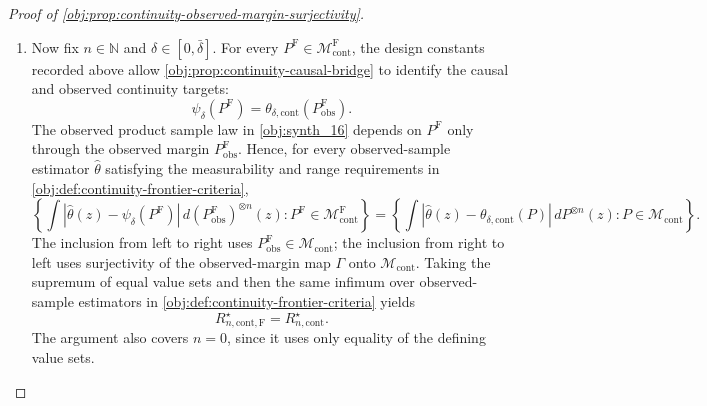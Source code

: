 \begin{proof}[Proof of \cref{obj:prop:continuity-observed-margin-surjectivity}]
\begin{enumerate}
\[
m_x^{\mathrm F}(a)
=
P^{\mathrm F}(X=x)^{-1}
\int_{\{X=x\}}\mathsf Q_x(a,U)\,dP^{\mathrm F}
=
\int_0^1 \mathsf Q_x(a,u)\,d\lambda(u)
=
\eta_P(x,a),
\]
where \(P^{\mathrm F}(X=x)>0\) follows from \(0<p_{\min}\) and \cref{obj:ass:stratum-mass}.  Since \(a\mapsto\eta_P(x,a)\) is continuous on \([0,\bar\delta]\), \cref{obj:ass:full-data-response-continuity} holds.  Therefore
\[
P^{\mathrm F}\in\mathcal M_{\mathrm{cont}}^{\mathrm F},
\qquad
P^{\mathrm F}_{\mathrm{obs}}=P,
\]
with the observed margin understood as in \cref{obj:synth_13}.  This proves surjectivity. %

\item Now fix \(n\in\mathbb N\) and \(\delta\in[0,\bar\delta]\).  For every \(P^{\mathrm F}\in\mathcal M_{\mathrm{cont}}^{\mathrm F}\), the design constants recorded above allow \cref{obj:prop:continuity-causal-bridge} to identify the causal and observed continuity targets:
\[
\psi_\delta(P^{\mathrm F})
=
\theta_{\delta,\mathrm{cont}}(P^{\mathrm F}_{\mathrm{obs}}).
\]
The observed product sample law in \cref{obj:synth_16} depends on \(P^{\mathrm F}\) only through the observed margin \(P^{\mathrm F}_{\mathrm{obs}}\).  Hence, for every observed-sample estimator \(\widehat\theta\) satisfying the measurability and range requirements in \cref{obj:def:continuity-frontier-criteria},
\[
\left\{
\int \left|\widehat\theta(z)-\psi_\delta(P^{\mathrm F})\right|\,
d(P^{\mathrm F}_{\mathrm{obs}})^{\otimes n}(z):
P^{\mathrm F}\in\mathcal M_{\mathrm{cont}}^{\mathrm F}
\right\}
=
\left\{
\int \left|\widehat\theta(z)-\theta_{\delta,\mathrm{cont}}(P)\right|\,
dP^{\otimes n}(z):
P\in\mathcal M_{\mathrm{cont}}
\right\}.
\]
The inclusion from left to right uses \(P^{\mathrm F}_{\mathrm{obs}}\in\mathcal M_{\mathrm{cont}}\); the inclusion from right to left uses surjectivity of the observed-margin map \(\Gamma\) onto \(\mathcal M_{\mathrm{cont}}\).  Taking the supremum of equal value sets and then the same infimum over observed-sample estimators in \cref{obj:def:continuity-frontier-criteria} yields
\[
R_{n,\mathrm{cont},\mathrm F}^\star
=
R_{n,\mathrm{cont}}^\star .
\]
The argument also covers \(n=0\), since it uses only equality of the defining value sets. %


\end{enumerate}
\end{proof}
